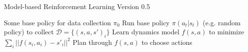 \begin{algorithm}[t!]
\caption{Model-based Reinforcement Learning Version 0.5}
\begin{algorithmic}[1]
\label{alg:mb05}
\REQUIRE Some base policy for data collection $\pi_0$
\STATE Run base policy $\pi(a_t|s_t)$ (e.g. random policy) to collect $\mathcal{D} = \{(s,a,s')_i\}$
\STATE Learn dynamics model $f(s,a)$ to minimize $\sum_i\lvert|f(s_i,a_i)-s'_i|\rvert^2$
\STATE Plan through $f(s,a)$ to choose actions
\end{algorithmic}
\end{algorithm}